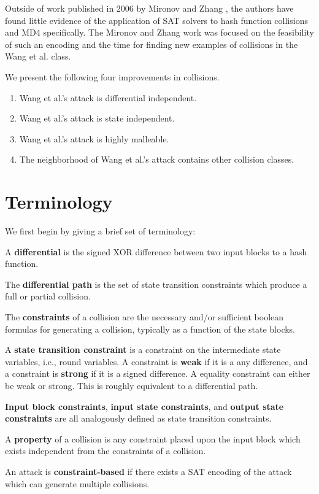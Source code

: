 \documentclass[letterpaper,twocolumn,10pt]{article}
\begin{document}
Outside of work published in 2006 by Mironov and Zhang \cite{Mironov2006},
the authors have found little evidence of the application of SAT solvers
to hash function collisions and MD4 specifically. The Mironov and Zhang work
was focused on the feasibility of such an encoding and the time for finding
new examples of collisions in the Wang et al. class.

We present the following four improvements in collisions.
\begin{enumerate}
    \itemsep0em
    \item Wang et al.'s attack is differential independent.
    \item Wang et al.'s attack is state independent.
    \item Wang et al.'s attack is highly malleable.
    \item The neighborhood of Wang et al.'s attack contains other collision classes.
\end{enumerate}

\section{Terminology}
We first begin by giving a brief set of terminology:

A \textbf{differential} is the signed XOR difference between two input blocks
to a hash function.

The \textbf{differential path} is the set of state transition constraints
which produce a full or partial collision.

The \textbf{constraints} of a collision are the necessary and/or sufficient
boolean formulas for generating a collision, typically as a function of the
state blocks.

A \textbf{state transition constraint} is a constraint on the intermediate
state variables, i.e., round variables. A constraint is \textbf{weak} if
it is a any difference, and a constraint is \textbf{strong} if it is a
signed difference. A equality constraint can either be weak or strong. This
is roughly equivalent to a differential path.

\textbf{Input block constraints}, \textbf{input state constraints}, and
\textbf{output state constraints} are all analogously defined as state
transition constraints.

A \textbf{property} of a collision is any constraint placed upon the
input block which exists independent from the constraints of a collision.

An attack is \textbf{constraint-based} if there exists a SAT encoding of the
attack which can generate multiple collisions.
\end{document}
